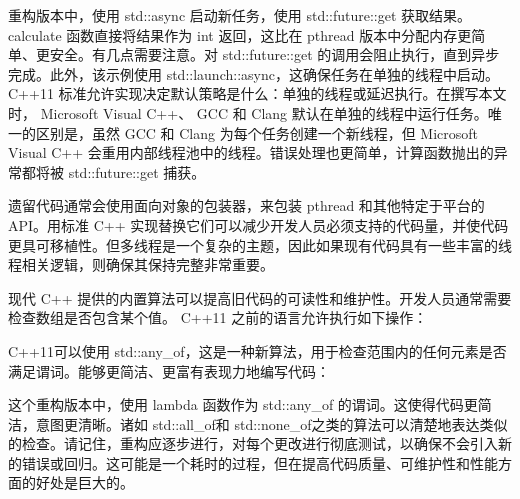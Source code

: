 重构版本中，使用 std::async 启动新任务，使用 std::future::get 获取结果。 calculate 函数直接将结果作为 int 返回，这比在 pthread 版本中分配内存更简单、更安全。有几点需要注意。对 std::future::get 的调用会阻止执行，直到异步完成。此外，该示例使用 std::launch::async，这确保任务在单独的线程中启动。 C++11 标准允许实现决定默认策略是什么：单独的线程或延迟执行。在撰写本文时， Microsoft Visual C++、 GCC 和 Clang 默认在单独的线程中运行任务。唯一的区别是，虽然 GCC 和 Clang 为每个任务创建一个新线程，但 Microsoft Visual C++ 会重用内部线程池中的线程。错误处理也更简单，计算函数抛出的异常都将被 std::future::get 捕获。

遗留代码通常会使用面向对象的包装器，来包装 pthread 和其他特定于平台的 API。用标准 C++ 实现替换它们可以减少开发人员必须支持的代码量，并使代码更具可移植性。但多线程是一个复杂的主题，因此如果现有代码具有一些丰富的线程相关逻辑，则确保其保持完整非常重要。

现代 C++ 提供的内置算法可以提高旧代码的可读性和维护性。开发人员通常需要检查数组是否包含某个值。 C++11 之前的语言允许执行如下操作：


C++11可以使用 std::any\_of，这是一种新算法，用于检查范围内的任何元素是否满足谓词。能够更简洁、更富有表现力地编写代码：


这个重构版本中，使用 lambda 函数作为 std::any\_of 的谓词。这使得代码更简洁，意图更清晰。诸如 std::all\_of和 std::none\_of之类的算法可以清楚地表达类似的检查。请记住，重构应逐步进行，对每个更改进行彻底测试，以确保不会引入新的错误或回归。这可能是一个耗时的过程，但在提高代码质量、可维护性和性能方面的好处是巨大的。











